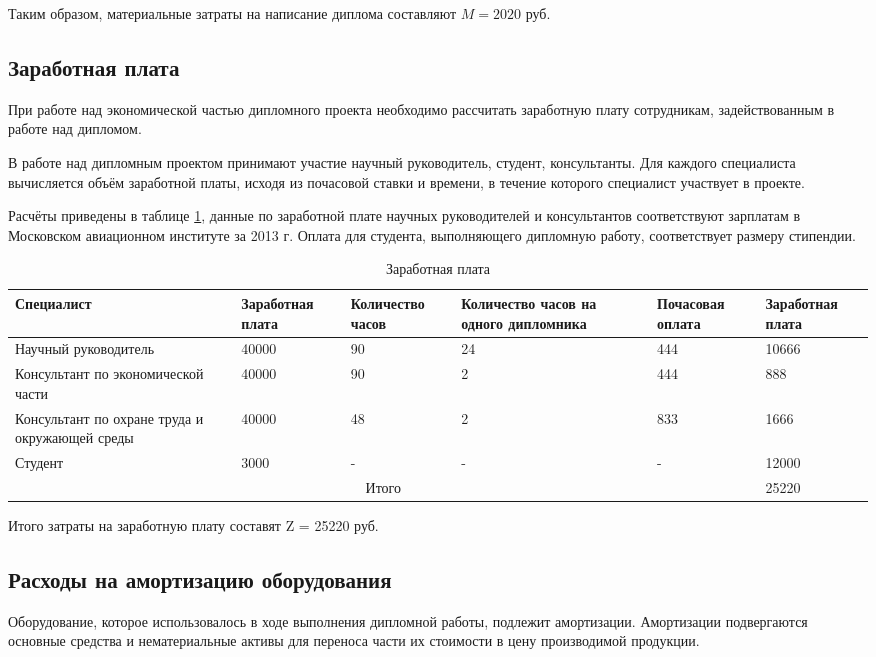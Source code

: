 Таким образом, материальные затраты на написание диплома составляют $M=2020$ руб.

\subsection{Заработная плата}
\label{zp}

При работе над экономической частью дипломного проекта необходимо рассчитать заработную плату сотрудникам, задействованным в работе над дипломом.

В работе над дипломным проектом принимают участие научный руково\-дитель, студент, консультанты. Для каждого специалиста вычисляется объём заработной платы, исходя из почасовой ставки и  времени, в течение которого специалист участвует в проекте.

Расчёты приведены в таблице \ref{zp2013}, данные по заработной плате научных ру\-ководителей и консультантов соответствуют зарплатам в Московском авиа\-ционном институте за 2013 г. Оплата для студента, выполняющего дипломную работу, соответствует размеру стипендии.
\begin{table}[H]
\caption{Заработная плата \label{zp2013}}
\begin{center}
\begin{tabular}{|p{3.5cm}|p{1.8cm}|p{1.6cm}|p{2.8cm}|p{2.1cm}|p{1.8cm}|}
\hline
Специалист&Заработ\-ная плата&Коли\-чество часов &Количество часов на одного дипломника&Почасовая оплата&Заработ\-ная плата\\
\hline
Научный руководитель&40000&90&24&444&10666\\
\hline
Консультант по экономической части&40000&90&2&444&888\\
\hline
Консультант по охране труда и окружающей среды&40000&48&2&833&1666\\
\hline
Студент&3000&-&-&-&12000\\
\hline
\multicolumn{5}{|c|}{Итого}&25220\\
\hline
\end{tabular}
\end{center}
\end{table}

Итого затраты на заработную плату составят Z = 25220 руб.

\subsection{Расходы на амортизацию оборудования}

Оборудование, которое использовалось в ходе выполнения дипломной ра\-боты, подлежит амортизации. Амортизации подвергаются основные средства и нематериальные активы для переноса части их стоимости в цену произво\-димой продукции.

